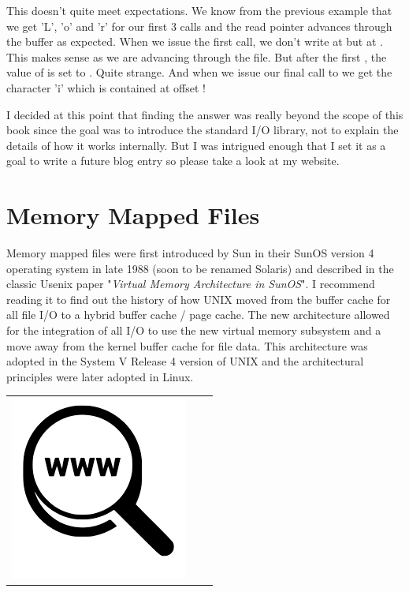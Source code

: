 \noindent
This doesn't quite meet expectations. We know from the previous example that we get 'L', 'o' and 'r' for our first 3  calls and the read pointer advances through the buffer as expected. When we issue the first  call, we don't write at  but at . This makes sense as we are advancing through the file. But after the first , the value of  is set to . Quite strange. And when we issue our final call to  we get the character 'i' which is contained at offset !

I decided at this point that finding the answer was really beyond the scope of this book since the goal was to introduce the standard I/O library, not to explain the details of how it works internally. But I was intrigued enough that I set it as a goal to write a future blog entry so please take a look at my website.


\section{Memory Mapped Files}\label{prog-mmap}

Memory mapped files were first introduced by Sun in their SunOS version 4 operating system in late 1988 (soon to be renamed Solaris) and described in the classic Usenix paper "\textit{Virtual Memory Architecture in SunOS}". I recommend reading it to find out the history of how UNIX moved from the buffer cache for all file I/O to a hybrid buffer cache / page cache. The new architecture allowed for the integration of all I/O to use the new virtual memory subsystem and a move away from the kernel buffer cache for file data. This architecture was adopted in the System V Release 4 version of UNIX and the architectural principles were later adopted in Linux.

\begin{table}[h]
\begin{tabular}{lcl}
\parbox[r]{0.5in}{ \includegraphics[scale=0.15]{figures/url.png}} & \parbox[l]{0.1in}{} & \parbox[l]{3in}{}
\end{tabular}
\end{table}

